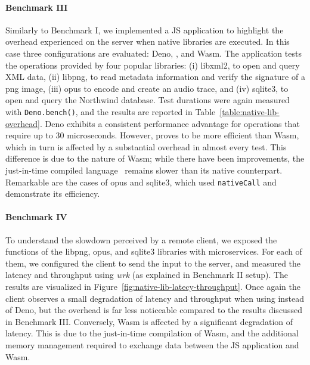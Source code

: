 \paragraph{Benchmark III}
%
Similarly to Benchmark I, we implemented a JS application to highlight
the overhead experienced on the server when native libraries are
executed. In this case three configurations are evaluated: Deno, \pap,
and Wasm. The application tests the operations provided by four
popular libraries: (i) libxml2, to open and query XML data, (ii) libpng, to read metadata information and verify the
signature of a png image, (iii) opus to encode and create an audio
trace, and (iv) sqlite3, to open and query the Northwind
database. Test durations were again measured with {\tt Deno.bench()},
and the results are reported in
Table~\ref{table:native-lib-overhead}. Deno
exhibits a consistent performance advantage for operations that
require up to 30 microseconds. However, \pap proves to be more
efficient than Wasm, which in turn is affected by a substantial
overhead in almost every test. This difference is due to the nature of
Wasm; while there have been improvements, the just-in-time
compiled language~\cite{wasm-compilation-pipeline}
remains slower than its native counterpart. Remarkable are the cases
of opus and sqlite3, which used {\tt nativeCall} and demonstrate its
efficiency.

\paragraph{Benchmark IV}
%
To understand the slowdown perceived by a remote client, we exposed
the functions of the libpng, opus, and sqlite3 libraries with
microservices. For each of them, we configured the client to send the
input to the server, and measured the latency and throughput using
{\em wrk} (as explained in Benchmark II setup). The results are
visualized in Figure~\ref{fig:native-lib-latecy-throughput}. Once
again the client observes a small degradation of
latency and throughput when using \pap instead of Deno, but the
overhead is far less noticeable compared to the results discussed in
Benchmark III. Conversely, Wasm is affected by a significant
degradation of latency. This is due to the just-in-time compilation of Wasm, and the additional memory
management required to exchange data between the JS application and
Wasm.

